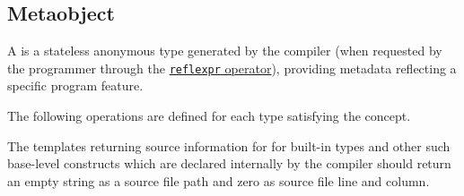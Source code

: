 \subsection{Metaobject}
\label{concept-Metaobject}

A  is a stateless anonymous type generated by the compiler
(when requested by the programmer through the 
\hyperref[section-reflection-operator]{\texttt{reflexpr} operator}),
providing metadata reflecting a specific program feature.





The following operations are defined for each type satisfying the 
concept.



The templates returning source information for for built-in types and other
such base-level constructs which are declared internally by the compiler
should return an empty string as a source file path and zero as source file
line and column.
